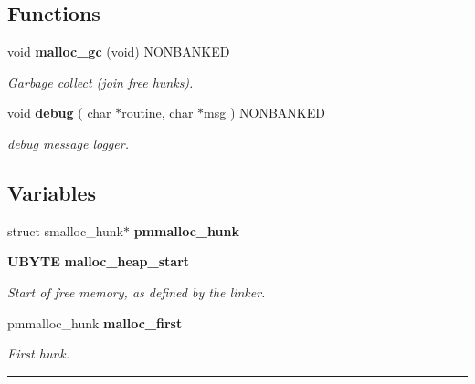 \subsection*{Functions}
\begin{CompactItemize}
\item 
\label{malloc.h_a3}
void {\bf malloc\_\-gc} (void) NONBANKED
\begin{CompactList}\small\item\em Garbage collect (join free hunks).\item\end{CompactList}

\item 
\label{malloc.h_a4}
void {\bf debug} ( char $\ast$routine, char $\ast$msg ) NONBANKED
\begin{CompactList}\small\item\em debug message logger.\item\end{CompactList}

\end{CompactItemize}
\subsection*{Variables}
\begin{CompactItemize}
\item 
\label{malloc.h_a6}
struct smalloc\_\-hunk$\ast$ {\bf pmmalloc\_\-hunk}
\item 
\label{malloc.h_a7}
{\bf UBYTE} {\bf malloc\_\-heap\_\-start}
\begin{CompactList}\small\item\em Start of free memory, as defined by the linker.\item\end{CompactList}

\item 
\label{malloc.h_a8}
pmmalloc\_\-hunk {\bf malloc\_\-first}
\begin{CompactList}\small\item\em First hunk.\item\end{CompactList}

\end{CompactItemize}
\vspace{0.4cm}\hrule\vspace{0.2cm}
